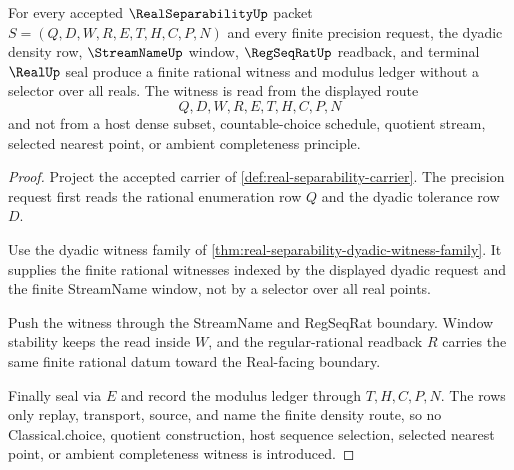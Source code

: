 \begin{theorem}
\label{thm:real-separability-countable-dense-choice-free}
For every accepted $\RealSeparabilityUp$ packet $S=(Q,D,W,R,E,T,H,C,P,N)$ and every finite precision request, the dyadic density row, $\StreamNameUp$ window, $\RegSeqRatUp$ readback, and terminal $\RealUp$ seal produce a finite rational witness and modulus ledger without a selector over all reals. The witness is read from the displayed route
$$
Q,D,W,R,E,T,H,C,P,N
$$
and not from a host dense subset, countable-choice schedule, quotient stream, selected nearest point, or ambient completeness principle.
\end{theorem}
\begin{proof}
Project the accepted carrier of \autoref{def:real-separability-carrier}. The precision request first reads the rational enumeration row $Q$ and the dyadic tolerance row $D$.

Use the dyadic witness family of \autoref{thm:real-separability-dyadic-witness-family}. It supplies the finite rational witnesses indexed by the displayed dyadic request and the finite StreamName window, not by a selector over all real points.

Push the witness through the StreamName and RegSeqRat boundary. Window stability keeps the read inside $W$, and the regular-rational readback $R$ carries the same finite rational datum toward the Real-facing boundary.

Finally seal via $E$ and record the modulus ledger through $T,H,C,P,N$. The rows only replay, transport, source, and name the finite density route, so no Classical.choice, quotient construction, host sequence selection, selected nearest point, or ambient completeness witness is introduced.
\end{proof}
